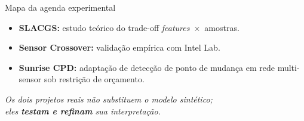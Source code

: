 \documentclass[aspectratio=169, 11pt]{beamer}
\begin{document}
\begin{frame}{Mapa da agenda experimental}

\begin{center}
\end{center}

\vspace{0.6em}
\begin{itemize}
  \item \textbf{SLACGS:} estudo teórico do trade-off \textit{features}~$\times$~amostras.
  \item \textbf{Sensor Crossover:} validação empírica com Intel Lab.
  \item \textbf{Sunrise CPD:} adaptação de detecção de ponto de mudança em
        rede multi-sensor sob restrição de orçamento.
\end{itemize}

\vspace{0.4em}
\begin{center}
\itshape\small
Os dois projetos reais não \emph{substituem} o modelo sintético;\\
eles \textbf{testam e refinam} sua interpretação.
\end{center}

\end{frame}
\end{document}
